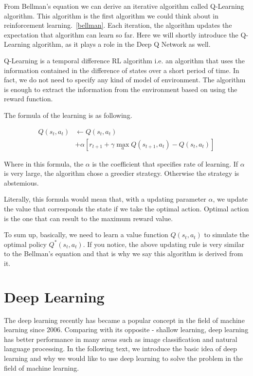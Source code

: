 \documentclass{article}
\begin{document}
From Bellman's equation we can derive an iterative algorithm called Q-Learning algorithm. This algorithm is the first algorithm we could think about in reinforcement learning.~\ref{bellman}\citep{watkins1989learning}. Each iteration, the algorithm updates the expectation that algorithm can learn so far. Here we will shortly introduce the Q-Learning algorithm, as it plays a role in the Deep Q Network as well.

Q-Learning is a temporal difference RL algorithm i.e. an algorithm that uses the information contained in the difference of states over a short period of time. In fact, we do not need to specify any kind of model of environment. The algorithm is enough to extract the information from the environment based on using the reward function. 

The formula of the learning is as following.

\begin{align*}
Q(s_t,a_t) &\leftarrow Q(s_t,a_t) \\
	& + \alpha \left[r_{t+1} + \gamma \max_a Q(s_{t+1},a_t) - Q(s_t,a_t) \right]
\end{align*}

Where in this formula, the $\alpha$ is the coefficient that specifies rate of learning. If $\alpha$ is very large, the algorithm chose a greedier strategy. Otherwise the strategy is abstemious.

Literally, this formula would mean that, with a updating parameter $\alpha$, we update the value that corresponds the state if we take the optimal action. Optimal action is the one that can result to the maximum reward value.

To sum up, basically, we need to learn a value function $Q(s_t,a_t)$ to simulate the optimal policy $Q^*(s_t,a_t)$. If you notice, the above updating rule is very similar to the Bellman's equation and that is why we say this algorithm is derived from it.

\section{Deep Learning}
The deep learning recently has became a popular concept in the field of machine learning since 2006. Comparing with its opposite - shallow learning, deep learning has better performance in many areas such as image classification and natural language processing. In the following text, we introduce the basic idea of deep learning and why we would like to use deep learning to solve the problem in the field of machine learning.
\end{document}
